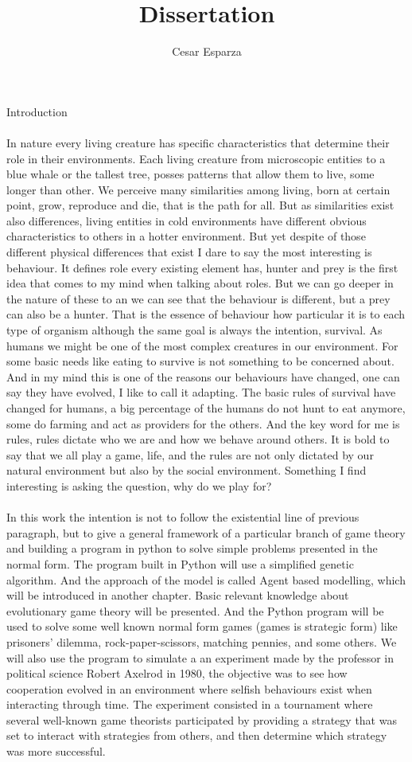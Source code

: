 \documentclass{article}
\title{Dissertation}
\author{Cesar Esparza}
\begin{document}
 
\maketitle
Introduction
\\\\ In nature every living creature has specific characteristics that determine their role in their environments. Each living creature from microscopic entities to a blue whale or the tallest tree, posses patterns that allow them to live, some longer than other. We perceive many similarities among living, born at certain point, grow, reproduce and die, that is the path for all. But as similarities exist also differences, living entities in cold environments have different obvious characteristics to others in a hotter environment. But yet despite of those different physical differences that exist I dare to say the most interesting is behaviour. It defines role every existing element has, hunter and prey is the first idea that comes to my mind when talking about roles. But we can go deeper in the nature of these to an we can see that the behaviour is different, but a prey can also be a hunter. That is the essence of behaviour how particular it is to each type of organism although the same goal is always the intention, survival.  As humans we might be one of the most complex creatures in our environment. For some basic needs like eating to survive is not something to be concerned about. And in my mind this is one of the reasons our behaviours have changed, one can say they have evolved, I like to call it adapting. The basic rules of survival  have changed for humans, a big percentage of the humans do not hunt to eat anymore,  some do farming and act as providers for the others. And the key word for me is rules, rules dictate who we are and how we behave  around others. It is bold to say that we all play a game, life, and the rules are not only dictated by our natural environment but also by the social environment. Something I find interesting is asking the question, why do we play for?
\\\\ In this work the intention is not to follow the existential line of previous paragraph, but to give a general framework of a particular branch of game theory and building a program in python to solve simple problems presented in the normal form. The program built in Python will use a simplified genetic algorithm. And the approach of the model is called Agent based modelling, which will be introduced in another chapter. Basic relevant knowledge about evolutionary game theory will be presented. And the Python program will be used to solve some well known normal form games (games is strategic form) like prisoners' dilemma, rock-paper-scissors, matching pennies, and some others. We will also use the program to simulate a an experiment made by the professor in political science Robert Axelrod in 1980, the objective was to see how cooperation evolved in an environment where selfish behaviours exist when interacting through time. The experiment consisted in a tournament where several well-known game theorists participated by providing a strategy that was set to interact with strategies from others, and then determine which strategy was more successful.  
 
\end{document}
